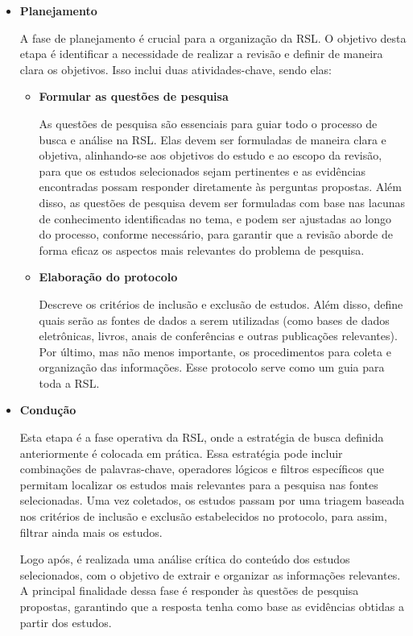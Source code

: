 \begin{itemize}
	\item \textbf{Planejamento}

A fase de planejamento é crucial para a organização da RSL. O objetivo desta etapa é identificar a necessidade de realizar a revisão e definir de maneira clara os objetivos. Isso inclui duas atividades-chave, sendo elas:

	\begin{itemize}
		\item 
		\textbf{Formular as questões de pesquisa}
		
			As questões de pesquisa são essenciais para guiar todo o processo de busca e análise na RSL. Elas devem ser formuladas de maneira clara e objetiva, alinhando-se aos objetivos do estudo e ao escopo da revisão, para que os estudos selecionados sejam pertinentes e as evidências encontradas possam responder diretamente às perguntas propostas. Além disso, as questões de pesquisa devem ser formuladas com base nas lacunas de conhecimento identificadas no tema, e podem ser ajustadas ao longo do processo, conforme necessário, para garantir que a revisão aborde de forma eficaz os aspectos mais relevantes do problema de pesquisa.
		
		\item 
		\textbf{Elaboração do protocolo}
		
			 Descreve os critérios de inclusão e exclusão de estudos. Além disso, define quais serão as fontes de dados a serem utilizadas (como bases de dados eletrônicas, livros, anais de conferências e outras publicações relevantes). Por último, mas não menos importante, os procedimentos para coleta e organização das informações. Esse protocolo serve como um guia para toda a RSL.
	\end{itemize}

	\item \textbf{Condução}
	
	Esta etapa é a fase operativa da RSL, onde a estratégia de busca definida anteriormente é colocada em prática. Essa estratégia pode incluir combinações de palavras-chave, operadores lógicos e filtros específicos que permitam localizar os estudos mais relevantes para a pesquisa nas fontes selecionadas. Uma vez coletados, os estudos passam por uma triagem baseada nos critérios de inclusão e exclusão estabelecidos no protocolo, para assim, filtrar ainda mais os estudos.
	
	Logo após, é realizada uma análise crítica do conteúdo dos estudos selecionados, com o objetivo de extrair e organizar as informações relevantes. A principal finalidade dessa fase é responder às questões de pesquisa propostas, garantindo que a resposta tenha como base as evidências obtidas a partir dos estudos.
	

\end{itemize}
